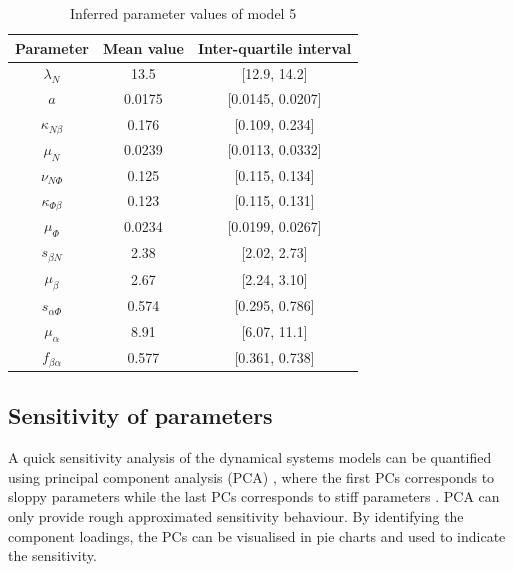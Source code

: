\begin{table}[H]
    \centering
    \begin{tabular}{|c c c|}
        \hline
        Parameter            & Mean value & Inter-quartile interval \\[0.5ex]
        \hline\hline
        $\lambda_N$          & 13.5       & [12.9, 14.2]            \\
        $a$                  & 0.0175     & [0.0145, 0.0207]        \\
        $\kappa_{N\beta}$    & 0.176      & [0.109, 0.234]          \\
        $\mu_N$              & 0.0239     & [0.0113, 0.0332]        \\
        $\nu_{N\Phi}$        & 0.125      & [0.115, 0.134]          \\
        \hline
        $\kappa_{\Phi\beta}$ & 0.123      & [0.115, 0.131]          \\
        $\mu_\Phi$           & 0.0234     & [0.0199, 0.0267]        \\
        \hline
        $s_{\beta N}$        & 2.38       & [2.02, 2.73]            \\
        $\mu_\beta$          & 2.67       & [2.24, 3.10]            \\
        \hline
        $s_{\alpha\Phi}$     & 0.574      & [0.295, 0.786]          \\
        $\mu_\alpha$         & 8.91       & [6.07, 11.1]            \\
        $f_{\beta\alpha}$    & 0.577      & [0.361, 0.738]          \\
        \hline
    \end{tabular}
    \caption[Inferred parameter values of model 5]
    {Inferred parameter values of model 5}
    \label{table:estimated5}
\end{table}


\subsection{Sensitivity of parameters}





A quick sensitivity analysis of the dynamical systems models can be quantified using principal component analysis (PCA) \cite{Toni}, where the first PCs corresponds to sloppy parameters while the last PCs corresponds to stiff parameters \cite{sensitivity}. PCA can only provide rough approximated sensitivity behaviour. By identifying the component loadings, the PCs can be visualised in pie charts and used to indicate the sensitivity. 

